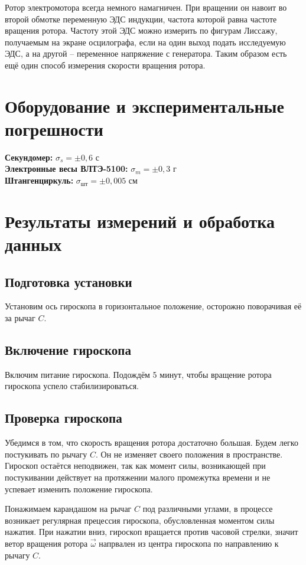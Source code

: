 \documentclass[a4paper,12pt]{article}
\begin{document}
Ротор электромотора всегда немного намагничен. При вращении он навоит во второй обмотке переменную ЭДС индукции, частота которой равна частоте вращения ротора. Частоту этой ЭДС можно измерить по фигурам Лиссажу, получаемым на экране осцилографа, если на один выход подать исследуемую ЭДС, а на другой -- переменное напряжение с генератора. Таким образом есть ещё один способ измерения скорости вращения ротора.

\section{Оборудование и экспериментальные погрешности}

\textbf{Секундомер:} $\sigma_s = \pm 0,6$ с \\ 
\textbf{Электронные весы ВЛТЭ-5100:} $\sigma_m = \pm 0,3$ г \\
\textbf{Штангенциркуль:} $\sigma_\text{шт} = \pm 0,005$ см \\

\section{Результаты измерений и обработка данных}
\subsection{Подготовка установки}

Установим ось гироскопа в горизонтальное положение, осторожно поворачивая её за рычаг $C$.

\subsection{Включение гироскопа}

Включим питание гироскопа. Подождём 5 минут, чтобы вращение ротора гироскопа успело стабилизироваться.

\subsection{Проверка гироскопа}

Убедимся в том, что скорость вращения ротора достаточно большая. Будем легко постукивать по рычагу $C$. Он не изменяет своего положения в пространстве. Гироскоп остаётся неподвижен, так как момент силы, возникающей при постукивании действует на протяжении малого промежутка времени и не успевает изменить положение гироскопа.

Понажимаем карандашом на рычаг $C$ под различными углами, в процессе возникает регулярная прецессия гироскопа, обусловленная моментом силы нажатия. При нажатии вниз, гироскоп вращается против часовой стрелки, значит ветор вращения ротора $\vec{\omega}$ напрвален из центра гироскопа по направлению к рычагу $C$.
\end{document}

